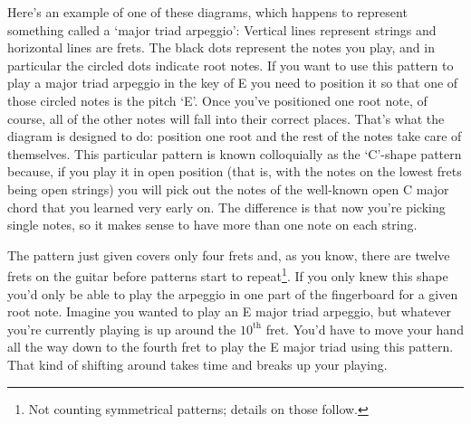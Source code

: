 \documentclass[english]{./gbook}
\begin{document}
\begin{large}
Here's an example of one of these diagrams, which happens to represent something called a `major triad arpeggio':
Vertical lines represent strings and horizontal lines are frets. The black dots represent the notes you play, and in particular the circled dots indicate root notes. If you want to use this pattern to play a major triad arpeggio in the key of E you need to position it so that one of those circled notes is the pitch `E'. Once you've positioned one root note, of course, all of the other notes will fall into their correct places. That's what the diagram is designed to do: position one root and the rest of the notes take care of themselves. This particular pattern is known colloquially as the `C'-shape pattern because, if you play it in open position (that is, with the notes on the lowest frets being open strings) you will pick out the notes of the well-known open C major chord that you learned very early on. The difference is that now you're picking single notes, so it makes sense to have more than one note on each string. 

The pattern just given covers only four frets and, as you know, there are twelve frets on the guitar before patterns start to repeat\footnote{Not counting symmetrical patterns; details on those follow.}. If you only knew this shape you'd only be able to play the arpeggio in one part of the fingerboard for a given root note. Imagine you wanted to play an E major triad arpeggio, but whatever you're currently playing is up around the $10^{\text{th}}$ fret. You'd have to move your hand all the way down to the fourth fret to play the E major triad using this pattern. That kind of shifting around takes time and breaks up your playing. 


\end{large}
\end{document}
